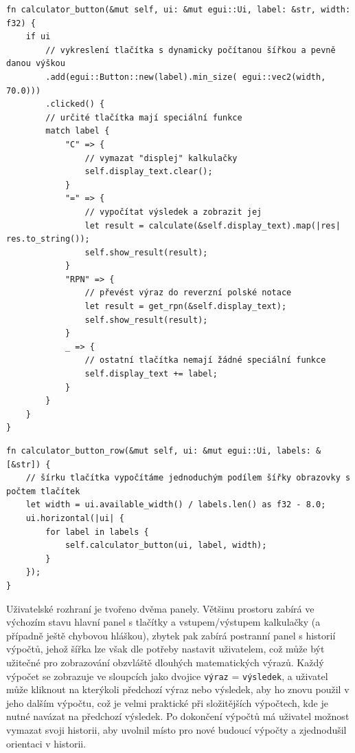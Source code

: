 \documentclass[12pt]{report}
\begin{document}
\begin{verbatim}
fn calculator_button(&mut self, ui: &mut egui::Ui, label: &str, width: f32) {
    if ui
        // vykreslení tlačítka s dynamicky počítanou šířkou a pevně danou výškou
        .add(egui::Button::new(label).min_size( egui::vec2(width, 70.0)))
        .clicked() {
        // určité tlačítka mají speciální funkce
        match label {
            "C" => {
                // vymazat "displej" kalkulačky
                self.display_text.clear();
            }
            "=" => {
                // vypočítat výsledek a zobrazit jej
                let result = calculate(&self.display_text).map(|res| res.to_string());
                self.show_result(result);
            }
            "RPN" => {
                // převést výraz do reverzní polské notace
                let result = get_rpn(&self.display_text);
                self.show_result(result);
            }
            _ => {
                // ostatní tlačítka nemají žádné speciální funkce
                self.display_text += label;
            }
        }
    }
}
\end{verbatim}
\begin{verbatim}
fn calculator_button_row(&mut self, ui: &mut egui::Ui, labels: &[&str]) {
    // šírku tlačítka vypočítáme jednoduchým podílem šířky obrazovky s počtem tlačítek
    let width = ui.available_width() / labels.len() as f32 - 8.0;
    ui.horizontal(|ui| {
        for label in labels {
            self.calculator_button(ui, label, width);
        }
    });
}
\end{verbatim}

\begin{minipage}{\textwidth}
Uživatelské rozhraní je tvořeno dvěma panely. Většinu prostoru zabírá ve výchozím stavu hlavní panel s tlačítky a vstupem/výstupem kalkulačky (a případně ještě chybovou hláškou), zbytek pak zabírá postranní panel s historií výpočtů, jehož šířka lze však dle potřeby nastavit uživatelem, což může být užitečné pro zobrazování obzvláště dlouhých matematických výrazů. Každý výpočet se zobrazuje ve sloupcích jako dvojice \texttt{výraz} = \texttt{výsledek}, a uživatel může kliknout na kterýkoli předchozí výraz nebo výsledek, aby ho znovu použil v jeho dalším výpočtu, což je velmi praktické při složitějších výpočtech, kde je nutné navázat na předchozí výsledek. Po dokončení výpočtů má uživatel možnost vymazat svoji historii, aby uvolnil místo pro nové budoucí výpočty a zjednodušil orientaci v historii.
\end{minipage}
\end{document}
